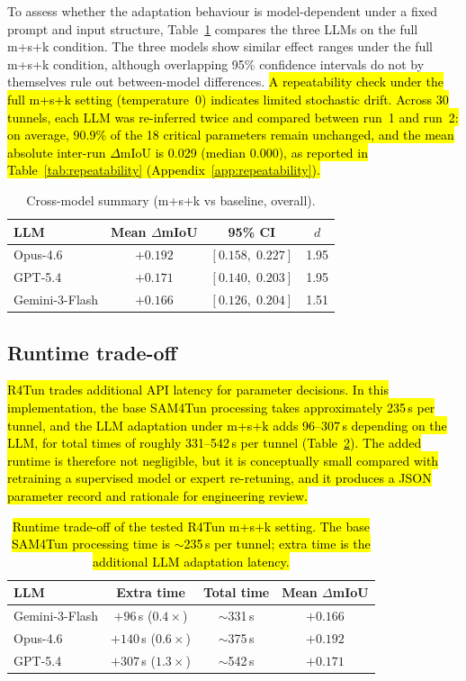 \documentclass[a4paper,fleqn]{cas-dc}
\begin{document}
{To assess whether the adaptation behaviour is model-dependent under a fixed prompt and input structure, Table~\ref{tab:cross-model} compares the three LLMs on the full m+s+k condition. The three models show similar effect ranges under the full m+s+k condition, although overlapping 95\% confidence intervals do not by themselves rule out between-model differences.
\hl{A repeatability check under the full \mbox{m+s+k} setting (temperature~0) indicates limited stochastic drift. Across 30 tunnels, each LLM was re-inferred twice and compared between run~1 and run~2: on average, 90.9\% of the 18 critical parameters remain unchanged, and the mean absolute inter-run \mbox{$\Delta$}mIoU is 0.029 (median 0.000), as reported in Table~\ref{tab:repeatability} (Appendix~\ref{app:repeatability}).}

\begin{table}[ht]
\caption{Cross-model summary (m+s+k vs baseline, overall).}\label{tab:cross-model}
\begin{tabular*}{\tblwidth}{@{} l c c c @{}}
\toprule
LLM & Mean $\Delta$mIoU & 95\% CI & \mbox{$d$} \\
\midrule
Opus-4.6 & $+0.192$ & $[0.158,\; 0.227]$ & 1.95 \\
GPT-5.4 & $+0.171$ & $[0.140,\; 0.203]$ & 1.95 \\
Gemini-3-Flash & $+0.166$ & $[0.126,\; 0.204]$ & 1.51 \\
\bottomrule
\end{tabular*}
\end{table}

\subsection{Runtime trade-off}\label{sec:runtime-tradeoff}

\hl{R4Tun trades additional API latency for parameter decisions. In this implementation, the base SAM4Tun processing takes approximately 235\,s per tunnel, and the LLM adaptation under m+s+k adds 96--307\,s depending on the LLM, for total times of roughly 331--542\,s per tunnel (Table~\ref{tab:runtime-tradeoff}). The added runtime is therefore not negligible, but it is conceptually small compared with retraining a supervised model or expert re-retuning, and it produces a JSON parameter record and rationale for engineering review. }

\begin{table}[ht]
\caption{\hl{Runtime trade-off of the tested R4Tun m+s+k setting. The base SAM4Tun processing time is $\sim$235\,s per tunnel; extra time is the additional LLM adaptation latency.}}\label{tab:runtime-tradeoff}
\begin{tabular*}{\tblwidth}{@{} l c c c @{}}
\toprule
LLM & Extra time & Total time & Mean $\Delta$mIoU \\
\midrule
Gemini-3-Flash & $+96$\,s ($0.4\times$) & $\sim$331\,s & $+0.166$ \\
Opus-4.6 & $+140$\,s ($0.6\times$) & $\sim$375\,s & $+0.192$ \\
GPT-5.4 & $+307$\,s ($1.3\times$) & $\sim$542\,s & $+0.171$ \\
\bottomrule
\end{tabular*}
\end{table}

}
\end{document}
